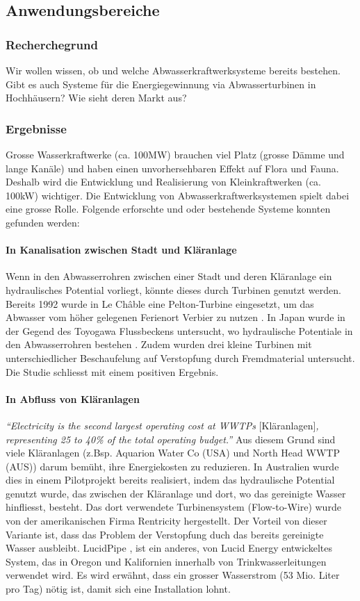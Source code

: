 \subsection{Anwendungsbereiche}
\subsubsection{Recherchegrund}
Wir wollen wissen, ob und welche Abwasserkraftwerksysteme bereits bestehen. Gibt es auch Systeme für die Energiegewinnung via Abwasserturbinen in Hochhäusern? Wie sieht deren Markt aus?
\subsubsection{Ergebnisse}
Grosse Wasserkraftwerke (ca. 100\si{MW}) brauchen viel Platz (grosse Dämme und lange Kanäle) und haben einen unvorhersehbaren Effekt auf Flora und Fauna. Deshalb wird die Entwicklung und Realisierung von Kleinkraftwerken (ca. 100\si{kW}) wichtiger. Die Entwicklung von Abwasserkraftwerksystemen spielt dabei eine grosse Rolle. Folgende erforschte und oder bestehende Systeme konnten gefunden werden:
\paragraph{In Kanalisation zwischen Stadt und Kläranlage}
Wenn in den Abwasserrohren zwischen einer Stadt und deren Kläranlage ein hydraulisches Potential vorliegt, könnte dieses durch Turbinen genutzt werden. Bereits 1992 wurde in Le Châble eine Pelton-Turbine eingesetzt, um das Abwasser vom höher gelegenen Ferienort Verbier zu nutzen \cite{waterworld}.
In Japan wurde in der Gegend des Toyogawa Flussbeckens untersucht, wo hydraulische Potentiale in den Abwasserrohren bestehen \cite{uchiyama2016feasibility}. Zudem wurden drei kleine Turbinen mit unterschiedlicher Beschaufelung auf Verstopfung durch Fremdmaterial untersucht. Die Studie schliesst mit einem positiven Ergebnis.
\paragraph{In Abfluss von Kläranlagen}
\textit{``Electricity is the second largest operating cost at WWTPs} [Kläranlagen]\textit{, representing 25 to 40\% of the total operating budget.''} \cite[2]{NYSERDA}
Aus diesem Grund sind viele Kläranlagen (z.Bsp. Aquarion Water Co (USA) und North Head WWTP (AUS)) darum bemüht, ihre Energiekosten zu reduzieren. In Australien wurde dies in einem Pilotprojekt bereits realisiert, indem das hydraulische Potential genutzt wurde, das zwischen der Kläranlage und dort, wo das gereinigte Wasser hinfliesst,  besteht. \cite{powermag} Das dort verwendete Turbinensystem (Flow-to-Wire) \cite{rentricity} wurde von der amerikanischen Firma Rentricity hergestellt. Der Vorteil von dieser Variante ist, dass das Problem der Verstopfung duch das bereits gereinigte Wasser ausbleibt.
LucidPipe \cite[4]{LUCIDPIPE}, ist ein anderes, von Lucid Energy entwickeltes System, das in Oregon und Kalifornien innerhalb von Trinkwasserleitungen verwendet wird. Es wird erwähnt, dass ein grosser Wasserstrom (53 Mio. Liter pro Tag) nötig ist, damit sich eine Installation lohnt. \cite[4]{LUCIDPIPE}
